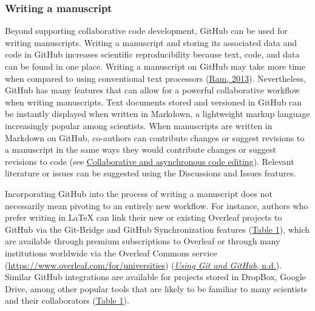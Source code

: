 \hypertarget{writing-a-manuscript}{%
\subsubsection{Writing a manuscript}\label{writing-a-manuscript}}

Beyond supporting collaborative code development, GitHub can be used for writing manuscripts.
Writing a manuscript and storing its associated data and code in GitHub increases scientific reproducibility because text, code, and data can be found in one place.
Writing a manuscript on GitHub may take more time when compared to using conventional text processors (\protect\hyperlink{ref-4ny1onB0}{Ram, 2013}).
Nevertheless, GitHub has many features that can allow for a powerful collaborative workflow when writing manuscripts.
Text documents stored and versioned in GitHub can be instantly displayed when written in Markdown, a lightweight markup language increasingly popular among scientists.
When manuscripts are written in Markdown on GitHub, co-authors can contribute changes or suggest revisions to a manuscript in the same ways they would contribute changes or suggest revisions to code (see \protect\hyperlink{code-editing}{Collaborative and asynchronous code editing}).
Relevant literature or issues can be suggested using the Discussions and Issues features.

Incorporating GitHub into the process of writing a manuscript does not necessarily mean pivoting to an entirely new workflow.
For instance, authors who prefer writing in LaTeX can link their new or existing Overleaf projects to GitHub via the Git-Bridge and GitHub Synchronization features (\protect\hyperlink{tbl:compare}{Table 1}), which are available through premium subscriptions to Overleaf or through many institutions worldwide via the Overleaf Commons service (\url{https://www.overleaf.com/for/universities}) (\protect\hyperlink{ref-oGbKxHzj}{\emph{Using Git and GitHub}, n.d.}).
Similar GitHub integrations are available for projects stored in DropBox, Google Drive, among other popular tools that are likely to be familiar to many scientists and their collaborators (\protect\hyperlink{tbl:compare}{Table 1}).

